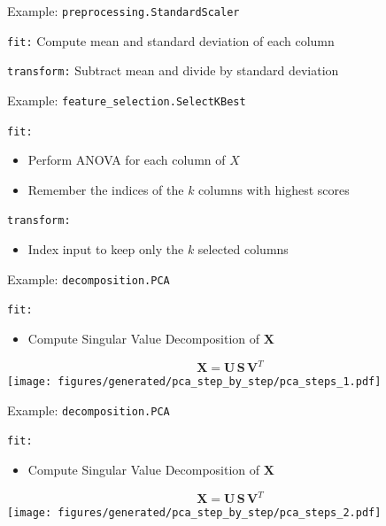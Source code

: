 \documentclass[presentation,mathserif,table]{beamer}
\newcommand{\X}{{\mathbold X}}
\newcommand{\bS}{{\mathbold S}}
\newcommand{\U}{{\mathbold U}}
\newcommand{\V}{{\mathbold V}}
\begin{document}
\begin{frame}[label={sec:org071d78a},fragile]{Example: \texttt{preprocessing.StandardScaler}}
 \begin{block}{\texttt{fit:}}
Compute mean and standard deviation of each column
\end{block}
\begin{block}{\texttt{transform:}}
Subtract mean and divide by standard deviation
\end{block}
\end{frame}
\begin{frame}[label={sec:orgbb9c7e8},fragile]{Example: \texttt{feature\_selection.SelectKBest}}
 \begin{block}{\texttt{fit:}}
\begin{itemize}
\item Perform ANOVA for each column of \(X\)
\item Remember the indices of the \(k\) columns with highest scores
\end{itemize}
\end{block}
\begin{block}{\texttt{transform:}}
\begin{itemize}
\item Index input to keep only the \(k\) selected columns
\end{itemize}
\end{block}
\end{frame}

\begin{frame}[label={sec:org4767ae2},fragile]{Example: \texttt{decomposition.PCA}}
 \begin{block}{\texttt{fit:}}
\begin{itemize}
\item Compute Singular Value Decomposition of \(\X\)
\end{itemize}
\begin{structureenv} %
\begin{equation}
\X = \U \, \bS \, \V^T
\end{equation}
\texttt{[image: figures/generated/pca\_step\_by\_step/pca\_steps\_1.pdf]}
\end{structureenv}
\end{block}
\end{frame}

\begin{frame}[label={sec:org0a546d5},fragile]{Example: \texttt{decomposition.PCA}}
 \begin{block}{\texttt{fit:}}
\begin{itemize}
\item Compute Singular Value Decomposition of \(\X\)
\end{itemize}
\begin{structureenv} %
\begin{equation}
\X = \U \, \bS \, \V^T
\end{equation}
\texttt{[image: figures/generated/pca\_step\_by\_step/pca\_steps\_2.pdf]}
\end{structureenv}
\end{block}
\end{frame}
\end{document}
